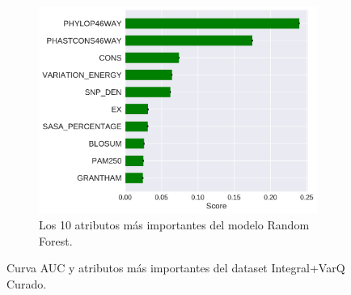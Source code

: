 \begin{figure}[H]
\begin{subfigure}[b]{0.7\textwidth}
    \includegraphics[width=\textwidth]{documents/latex/figures/3/integral_varq/importances_varq_integral.pdf}
    \caption{Los 10 atributos más importantes del modelo Random Forest.}
    \label{fig:importances_integral_varq}
\end{subfigure}

\caption{Curva AUC y atributos más importantes del dataset Integral+VarQ Curado.}
\end{figure}


